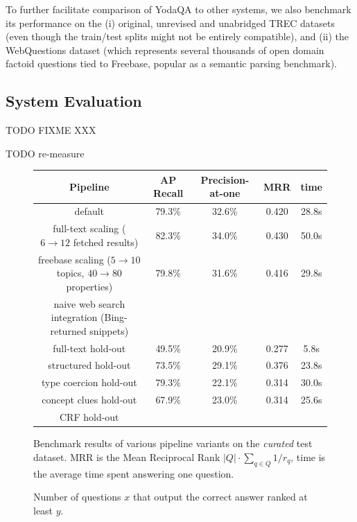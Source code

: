 To further facilitate comparison of YodaQA to other systems,
we also benchmark its performance on the (i) original, unrevised and
unabridged TREC datasets
(even though the train/test splits might not be entirely compatible),
and (ii) the WebQuestions dataset \cite{WebQuestions}
(which represents several thousands of open domain factoid questions
tied to Freebase, popular as a semantic parsing benchmark).

\subsection{System Evaluation}

TODO FIXME XXX

TODO re-measure

\begin{figure}[t]
\renewcommand{\arraystretch}{1.3}
\centering
\begin{tabular}{|c|cccc|}
\hline
Pipeline & AP Recall & Precision-at-one & MRR & time \\ \hline \hline
default & 79.3\% & 32.6\% & 0.420 & 28.8s \\
\hline
full-text scaling ($6\to12$ fetched results) & 82.3\% & 34.0\% & 0.430 & 50.0s \\
freebase scaling ($5\to10$ topics, $40\to80$ properties) & 79.8\% & 31.6\% & 0.416 & 29.8s \\
naive web search integration (Bing-returned snippets) & & & & \\
\hline
full-text hold-out & 49.5\% & 20.9\% & 0.277 & 5.8s \\
structured hold-out & 73.5\% & 29.1\% & 0.376 & 23.8s \\
\hline
type coercion hold-out & 79.3\% & 22.1\% & 0.314 & 30.0s \\
concept clues hold-out & 67.9\% & 23.0\% & 0.314 & 25.6s \\
CRF hold-out & & & & \\
\hline
\end{tabular}
\vspace*{-0.2cm}
\caption{Benchmark results of various pipeline variants on the \textit{curated} test dataset.
MRR is the Mean Reciprocal Rank $|Q|\cdot\sum_{q\in Q}{1/r_q}$, time is the average time spent answering one question.}
\label{fig:holdoutbench}
\end{figure}

\begin{figure}[t]
\begin{center}
\vspace*{-0.75cm}
\caption{Number of questions $x$ that output the correct answer ranked at least $y$.}
\label{fig:ranks}
\end{center}
\end{figure}%

